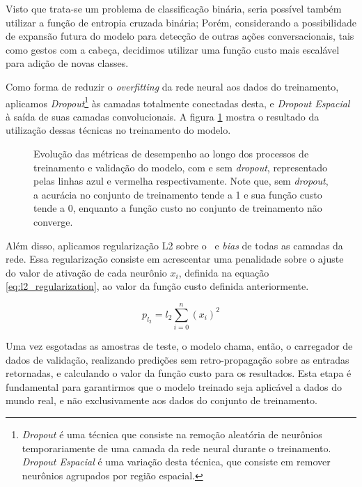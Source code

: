 Visto que trata-se um problema de classificação binária, seria possível também utilizar a função de entropia cruzada binária; Porém, considerando a possibilidade de expansão futura do modelo para detecção de outras ações conversacionais, tais como gestos com a cabeça, decidimos utilizar uma função custo mais escalável para adição de novas classes.

Como forma de reduzir o \textit{overfitting} da rede neural aos dados do treinamento, aplicamos \textit{Dropout}\footnote{\textit{Dropout} é uma técnica que consiste na remoção aleatória de neurônios temporariamente de uma camada da rede neural durante o treinamento. \textit{Dropout Espacial} é uma variação desta técnica, que consiste em remover neurônios agrupados por região espacial.} às camadas totalmente conectadas desta, e \textit{Dropout Espacial} à saída de suas camadas convolucionais.
A figura \ref{fig:training_metrics} mostra o resultado da utilização dessas técnicas no treinamento do modelo.

\begin{figure}[ht]
    \centering
    \resizebox{0.95\textwidth}{!}{
        
    }
    \caption{Evolução das métricas de desempenho ao longo dos processos de treinamento e validação do modelo, com e sem \textit{dropout}, representado pelas linhas azul e vermelha respectivamente. Note que, sem \textit{dropout}, a acurácia no conjunto de treinamento tende a 1 e sua função custo tende a 0, enquanto a função custo no conjunto de treinamento não converge. }
    \label{fig:training_metrics}
\end{figure}

Além disso, aplicamos regularização L2 sobre o \ e \textit{bias} de todas as camadas da rede.
Essa regularização consiste em acrescentar uma penalidade sobre o ajuste do valor de ativação de cada neurônio $x_i$, definida na equação \ref{eq:l2_regularization}, ao valor da função custo definida anteriormente.

\begin{equation}\label{eq:l2_regularization}
    p_{l_2} = l_2 \sum\limits_{i=0}^n(x_i)^2
\end{equation}

Uma vez esgotadas as amostras de teste, o modelo chama, então, o carregador de dados de validação, realizando predições sem retro-propagação sobre as entradas retornadas, e calculando o valor da função custo para os resultados.
Esta etapa é fundamental para garantirmos que o modelo treinado seja aplicável a dados do mundo real, e não exclusivamente aos dados do conjunto de treinamento.

